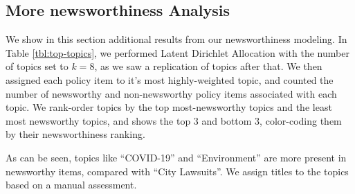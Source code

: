 \documentclass[11pt]{article}
\begin{document}
\subsection{More newsworthiness Analysis}

We show in this section additional results from our newsworthiness modeling. In Table \ref{tbl:top-topics}, we performed Latent Dirichlet Allocation \cite{blei2003latent} with the number of topics set to $k=8$, as we saw a replication of topics after that. We then assigned each policy item to it's most highly-weighted topic, and counted the number of newsworthy and non-newsworthy policy items associated with each topic. We rank-order topics by the top most-newsworthy topics and the least most newsworthy topics, and shows the top 3 and bottom 3, color-coding them by their newsworthiness ranking.

As can be seen, topics like ``COVID-19'' and ``Environment'' are more present in newsworthy items, compared with ``City Lawsuits''. We assign titles to the topics based on a manual assessment.
\end{document}

